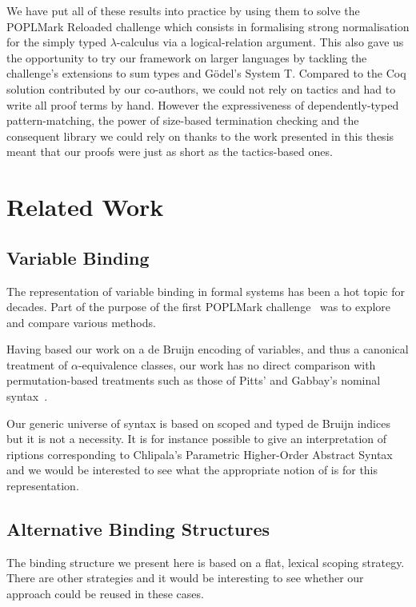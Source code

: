 We have put all of these results into practice by using them to solve the
POPLMark Reloaded challenge which consists in formalising strong
normalisation for the simply typed $\lambda$-calculus via a logical-relation
argument. This also gave us the opportunity to try our framework on larger
languages by tackling the challenge's extensions to sum types and G\"{o}del's
System T. Compared to the Coq solution contributed by our co-authors, we could
not rely on tactics and had to write all proof terms by hand. However the
expressiveness of dependently-typed pattern-matching, the power of size-based
termination checking and the consequent library we could rely on thanks to the
work presented in this thesis meant that our proofs were just as short as
the tactics-based ones.

\section{Related Work}


\subsection{Variable Binding} The representation of variable binding
in formal systems has been a hot topic for decades. Part of the purpose
of the first POPLMark challenge~\citeyear{poplmark} was to explore and
compare various methods.

Having based our work on a de Bruijn encoding of variables, and thus a
canonical treatment of \(\alpha\)-equivalence classes, our work has no
direct comparison with permutation-based treatments such as those of
Pitts' and Gabbay's nominal syntax~\citeyear{gabbay:newaas-jv}.

Our generic universe of syntax is based on
scoped and typed de Bruijn indices~\cite{de1972lambda} but it is not
a necessity. It is for instance possible to give an interpretation
of riptions corresponding to Chlipala's Parametric Higher-Order
Abstract Syntax~\citeyear{DBLP:conf/icfp/Chlipala08} and we would be interested
to see what the appropriate notion of  is for this representation.

\subsection{Alternative Binding Structures} The binding structure we
present here is based on a flat, lexical scoping strategy. There are
other strategies and it would be interesting to see whether
our approach could be reused in these cases.

